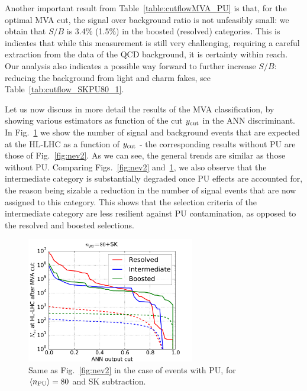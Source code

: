 Another important result from Table~\ref{table:cutflowMVA_PU} is that,
for the optimal MVA cut, the signal over background ratio
is not unfeasibly small: we obtain that $S/B$ is 3.4\% (1.5\%)
in the boosted (resolved) categories.
%
This is indicates that while this measurement is still very challenging,
requiring a careful extraction from the data of the QCD
background, it is certainty within reach.
%
Our analysis also indicates a possible way forward to
further increase $S/B$: reducing the background from light and charm
fakes, see Table~\ref{tab:cutflow_SKPU80_1}.

Let us now discuss in more detail the results of the MVA
classification, by showing various estimators as function
of the cut $y_{\rm cut}$ in the ANN discriminant.
%
In Fig.~\ref{fig:nev2_PU}
we show the number of signal and background events that
are expected at the HL-LHC as a function of
$y_{\rm cut}$ -
the corresponding results without PU are those of
Fig.~\ref{fig:nev2}.
%
As we can see, the general trends are
similar as those without PU.
%
Comparing Figs.~\ref{fig:nev2} and~\ref{fig:nev2_PU}, we also observe
that the intermediate category is substantially degraded once PU effects
are accounted for, the reason being  sizable
a reduction in the number of signal
events that are now assigned to this category.
%
This shows that the selection criteria
of the intermediate category are less
resilient against PU contamination,
as opposed to the resolved and boosted selections.

\begin{figure}[t]
\begin{center}
\includegraphics[width=0.65\textwidth]{plots/nev2_SKPU80.pdf}
\caption{\small Same as Fig.~\ref{fig:nev2} in the
case of events with PU, for
 $\left\langle n_{\rm PU}\right\rangle=80$ 
  and SK subtraction.
}
\label{fig:nev2_PU}
\end{center}
\end{figure}


